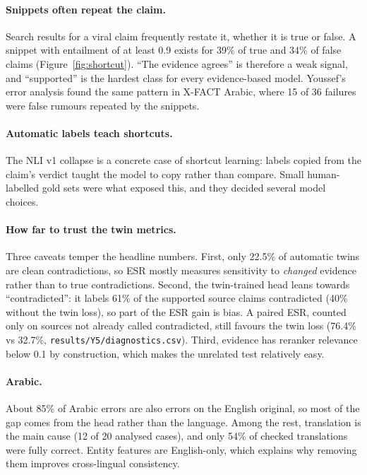 \paragraph{Snippets often repeat the claim.}
Search results for a viral claim frequently restate it, whether it is true or false. A snippet with entailment of at least 0.9 exists for 39\% of true and 34\% of false claims (Figure~\ref{fig:shortcut}). ``The evidence agrees'' is therefore a weak signal, and ``supported'' is the hardest class for every evidence-based model. Youssef's error analysis found the same pattern in X-FACT Arabic, where 15 of 36 failures were false rumours repeated by the snippets.

\paragraph{Automatic labels teach shortcuts.}
The NLI v1 collapse is a concrete case of shortcut learning: labels copied from the claim's verdict taught the model to copy rather than compare. Small human-labelled gold sets were what exposed this, and they decided several model choices.

\paragraph{How far to trust the twin metrics.}
Three caveats temper the headline numbers. First, only 22.5\% of automatic  twins are clean contradictions, so ESR mostly measures sensitivity to \emph{changed} evidence rather than to true contradictions. Second, the twin-trained head leans towards ``contradicted'': it labels 61\% of the supported source claims contradicted (40\% without the twin loss), so part of the ESR gain is bias. A paired ESR, counted only on sources not already called contradicted, still favours the twin loss (76.4\% vs 32.7\%, \texttt{results/Y5/diagnostics.csv}). Third,  evidence has reranker relevance below 0.1 by construction, which makes the unrelated test relatively easy.

\paragraph{Arabic.}
About 85\% of Arabic errors are also errors on the English original, so most of the gap comes from the head rather than the language. Among the rest, translation is the main cause (12 of 20 analysed cases), and only 54\% of checked translations were fully correct. Entity features are English-only, which explains why removing them improves cross-lingual consistency.

